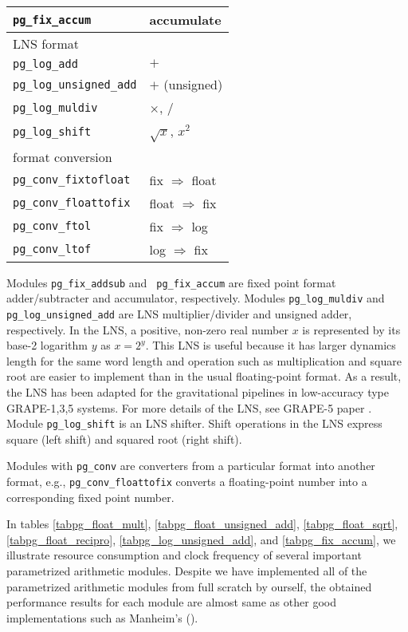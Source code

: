 \documentclass{llncs}
\begin{document}
\begin{table}
\begin{center}
\begin{minipage}{.45\linewidth}
\begin{tabular}{ll}
	{\tt pg\_fix\_accum}           &  accumulate\\
	\hline
	LNS format& \\
	\hline
	{\tt pg\_log\_add}             &  $+$\\
	{\tt pg\_log\_unsigned\_add}   &  $+$ (unsigned)\\
	{\tt pg\_log\_muldiv}          &  $\times$, $/$\\
	{\tt pg\_log\_shift}           &  $\sqrt{x}$, $x^2$\\
	\hline
	format conversion & \\
	\hline
	{\tt pg\_conv\_fixtofloat}     &  fix $\Rightarrow$ float\\
	{\tt pg\_conv\_floattofix}     &  float $\Rightarrow$ fix\\
	{\tt pg\_conv\_ftol}           &  fix $\Rightarrow$ log\\
	{\tt pg\_conv\_ltof}           &  log $\Rightarrow$ fix\\
	\hline
      \end{tabular}
    \end{minipage}
  \end{center}
  \label{tabpgmod}
\end{table}

Modules {\tt pg\_fix\_addsub} and {\tt
pg\_fix\_accum} are fixed point format adder/subtracter and
accumulator, respectively.  Modules {\tt pg\_log\_muldiv} and {\tt
pg\_log\_unsigned\_add} are LNS multiplier/divider and
unsigned adder, respectively. In the LNS, a positive,
non-zero real number $x$ is represented by its base-2 logarithm $y$ as
$x=2^{y}$.
This LNS is useful because 
it has larger dynamics length for the same word length and
operation such as multiplication and square root
are easier to implement than in the usual floating-point format.
As a result, the LNS has been adapted for the
gravitational pipelines in low-accuracy type GRAPE-1,3,5 systems.
For more details of the LNS, see GRAPE-5 paper
\cite{KFMT00}.
Module {\tt pg\_log\_shift} is an LNS
shifter. Shift operations in the LNS express square
(left shift) and squared root (right shift). 

Modules with {\tt pg\_conv} are converters from a particular format
into another format, e.g., {\tt pg\_conv\_floattofix} converts
a floating-point number into a corresponding fixed point number.

In tables \ref{tabpg_float_mult}, \ref{tabpg_float_unsigned_add},
\ref{tabpg_float_sqrt}, \ref{tabpg_float_recipro},
\ref{tabpg_log_unsigned_add}, and \ref{tabpg_fix_accum}, we illustrate
resource consumption and clock frequency of several important
parametrized arithmetic modules.
Despite we have implemented all of the parametrized arithmetic modules
from full scratch by ourself, 
the obtained performance results for each module
are almost same as other good implementations such as Manheim's (\cite{LKM02}).
\end{document}
